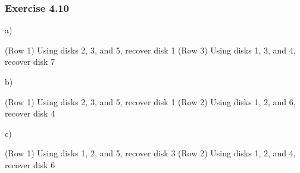 \documentclass[../../main.tex]{subfiles}
\begin{document}
\subsubsection*{Exercise 4.10}

a)

(Row 1) Using disks 2, 3, and 5, recover disk 1
(Row 3) Using disks 1, 3, and 4, recover disk 7

b)

(Row 1) Using disks 2, 3, and 5, recover disk 1
(Row 2) Using disks 1, 2, and 6, recover disk 4

c)

(Row 1) Using disks 1, 2, and 5, recover disk 3
(Row 2) Using disks 1, 2, and 4, recover disk 6
\end{document}
